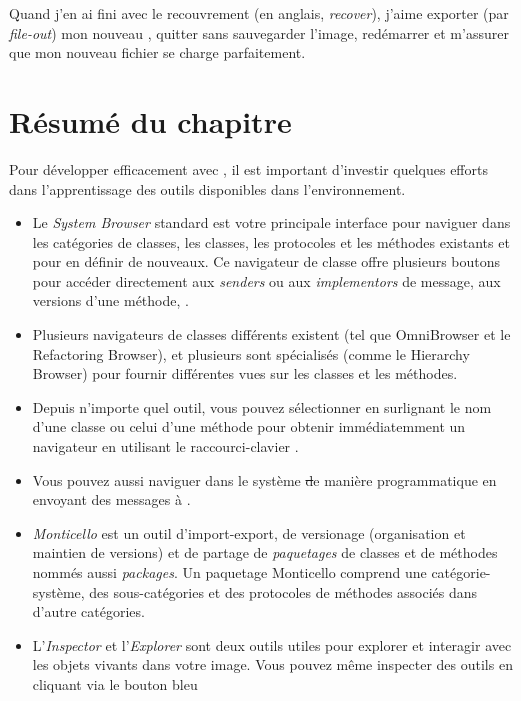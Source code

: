 \documentclass[a4paper,10pt,twoside]{book}
\begin{document}
Quand j'en ai fini avec le recouvrement (en anglais, \emph{recover}), 
j'aime exporter (par \emph{file-out}) mon nouveau \changeset, quitter \sq
sans sauvegarder l'image, red\'emarrer et m'assurer que mon nouveau fichier
se charge parfaitement.

\section{R\'esum\'e du chapitre}

Pour d\'evelopper efficacement avec \Squeak, il est
important d'investir quelques efforts dans l'apprentissage des outils
disponibles dans l'environnement.

\begin{itemize}
  \item Le \emph{System Browser} standard est votre principale interface pour naviguer dans les cat\'egories de classes, les classes, les protocoles et les m\'ethodes existants et pour en d\'efinir de nouveaux.
Ce navigateur de classe offre plusieurs boutons pour acc\'eder directement aux \emph{senders} ou aux \emph{implementors} de message, aux versions d'une m\'ethode, 
\etc.
  \item Plusieurs navigateurs de classes diff\'erents existent
(tel que OmniBrowser et le Refactoring Browser), et plusieurs sont sp\'ecialis\'es (comme le Hierarchy Browser) pour fournir diff\'erentes vues sur les classes et les m\'ethodes.
  \item Depuis n'importe quel outil, vous pouvez s\'electionner en surlignant le nom d'une classe ou celui d'une m\'ethode pour obtenir imm\'ediatemment
un navigateur en utilisant le raccourci-clavier .
  \item Vous pouvez aussi naviguer dans le syst\`eme \st de mani\`ere
programmatique en envoyant des messages \`a .
  \item \emph{Monticello} est un outil d'import-export, de versionage (organisation et maintien de versions) et de partage de \emph{paquetages} de classes et de m\'ethodes nomm\'es aussi \emph{packages}.
  Un paquetage Monticello comprend une cat\'egorie-syst\`eme, des sous-cat\'egories et des protocoles de m\'ethodes associ\'es dans d'autre cat\'egories. 
  \item L'\emph{Inspector} et l'\emph{Explorer} sont deux outils utiles
pour explorer et interagir avec les objets vivants dans votre image.
Vous pouvez m\^eme inspecter des outils en cliquant via le bouton bleu 

\end{itemize}
\end{document}
